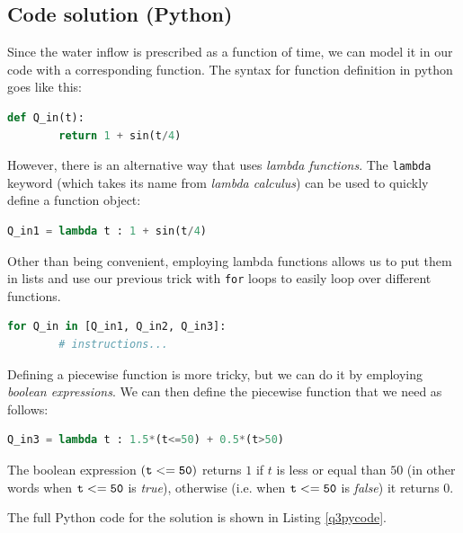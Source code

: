 \documentclass{article}
\newcommand{\py}[1]{\texttt{\lstinline!#1!}}
\begin{document}
\subsection{Code solution (Python)}
Since the water inflow is prescribed as a function of time, we can model it in our code with a corresponding function. The syntax for function definition in python goes like this:
\begin{lstlisting}[language=Python]
    def Q_in(t):
        return 1 + sin(t/4)
\end{lstlisting}
However, there is an alternative way that uses \emph{lambda functions}. The \py{lambda} keyword (which takes its name from \emph{lambda calculus}) can be used to quickly define a function object:
\begin{lstlisting}[language=Python]
    Q_in1 = lambda t : 1 + sin(t/4) 
\end{lstlisting}

Other than being convenient, employing lambda functions allows us to put them in lists and use our previous trick with \py{for} loops to easily loop over different functions. 
\begin{lstlisting}[language=Python]
    for Q_in in [Q_in1, Q_in2, Q_in3]:
        # instructions...
\end{lstlisting}

Defining a piecewise function is more tricky, but we can do it by employing \emph{boolean expressions}. 
 We can then define the piecewise function that we need as follows:
\begin{lstlisting}[language=Python]
    Q_in3 = lambda t : 1.5*(t<=50) + 0.5*(t>50)
\end{lstlisting}

The boolean expression ${\tt (t<=50)}$ returns $1$ if $t$ is less or equal than $50$ (in other words when ${\tt t<=50}$ is \emph{true}), otherwise (i.e. when ${\tt t<=50}$ is \emph{false}) it returns $0$.

The full Python code for the solution is shown in Listing \ref{q3pycode}. 

\end{document}
